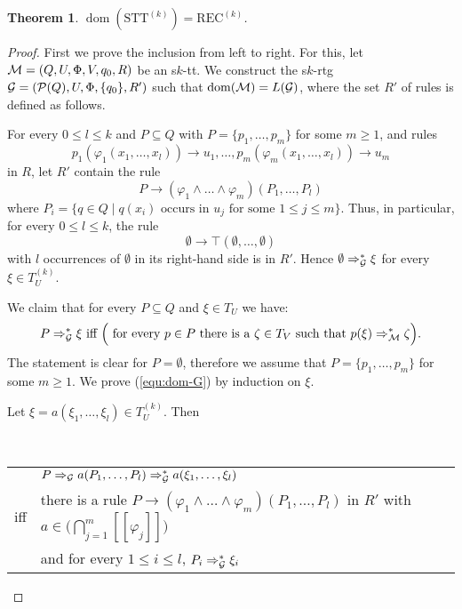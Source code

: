 \documentclass[10pt]{scrartcl}
\newtheorem{theo}[df]{Theorem}
\newcommand{\seml}{[\![}
\newcommand{\semr}{]\!]}
\newcommand{\REC}{\mathrm{REC}}
\newcommand{\STT}{\mathrm{STT}}
\newcommand{\M}{{\cal M}}
\newcommand{\G}{{\cal G}}
\newcommand{\PS}{{\cal P}}
\DeclareMathOperator{\dom}{dom}
\def\ui#1{^{(#1)}}
\begin{document}
\begin{theo} \label{dom-theo}$\dom(\STT\ui k) = \REC\ui k$.
\end{theo}
\begin{proof} First we prove the inclusion from left to right. For
  this, let $\M = (Q,U,\Phi,V,q_0,R)$ be an s$k$-tt. We construct the
  s$k$-rtg $\G = (\PS(Q),U,\Phi,\{q_0\},R')$ such that $\dom(\M) = L(\G)$, where the set
$R'$ of rules is defined as follows.
 
For every $0 \le l \le k$ and  $P \subseteq Q$ with $P = \{p_1,\ldots,p_m\}$ for some
$m \ge 1$, and rules
\begin{equation}
 p_1(\varphi_1(x_1,\ldots,x_l)) \rightarrow u_1,
  \ldots, p_m(\varphi_m(x_1,\ldots,x_l)) \rightarrow u_m \label{rules} 
\end{equation}
in $R$, let $R'$ contain the rule
\[
P\rightarrow (\varphi_1 \wedge \ldots \wedge \varphi_m)(P_1,\ldots,P_l)
\]
where $P_i = \{q \in Q \mid q(x_i) \text{ occurs in } u_j \text{ for
  some $1 \le j \le m$}\}$. Thus, in particular, for every $0\le l\le k$, the rule
\[
\emptyset \rightarrow
\top(\emptyset,\ldots,\emptyset)
\]
with $l$ occurrences of $\emptyset$ in its right-hand side is in $R'$. Hence $\emptyset \Rightarrow_\G^* \xi$ for every $\xi\in T_U^{(k)}$.

We claim that for every $P \subseteq Q$ and $\xi \in T_U$ we have:
\begin{equation}
P \Rightarrow_\G^* \xi\text{  iff $\Big($ for every $p \in P$ there is a $\zeta \in T_V$ such that } p(\xi)
\Rightarrow_\M^* \zeta\Big). \label{equ:dom-G}
\end{equation}
The statement is clear for $P=\emptyset$, therefore we assume that $P = \{p_1,\ldots,p_m\}$ for some
$m \ge 1$. We prove (\ref{equ:dom-G}) by induction on $\xi$.


Let $\xi = a(\xi_1,\ldots,\xi_l) \in T_U^{(k)}$. Then

\


\begin{tabular}{cl}
& $P \Rightarrow_\G a(P_1,\ldots,P_l)\Rightarrow_\G^*
a(\xi_1,\ldots,\xi_l)$ \\[3mm]

iff & there is a rule  $P\rightarrow (\varphi_1 \wedge \ldots \wedge \varphi_m)(P_1,\ldots,P_l)$ in $R'$ with $a\in \big(\bigcap_{j=1}^m\seml \varphi_j\semr\big)$\\[1mm]

& and for every $1\le i\le l$, $P_i \Rightarrow_\G^* \xi_i$ \\[3mm]


\end{tabular}
\end{proof}
\end{document}
